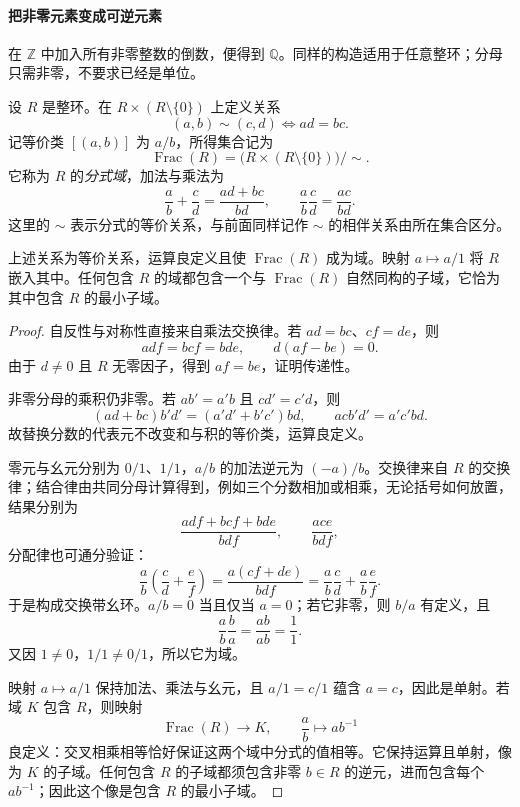 \documentclass[lang=cn,a4paper,fontset=none,zihao=false,10pt,openany,twoside]{beautybook}
\numberwithin{algorithm}{chapter}
\begin{document}
\paragraph{把非零元素变成可逆元素}
在 $\mathbb Z$ 中加入所有非零整数的倒数，便得到 $\mathbb Q$。同样的构造适用于任意整环；分母只需非零，不要求已经是单位。
\begin{definition}[分式域]
设 $R$ 是整环。在 $R\times(R\setminus\{0\})$ 上定义关系
\[
 (a,b)\sim(c,d)\Longleftrightarrow ad=bc.
\]
记等价类 $[(a,b)]$ 为 $a/b$，所得集合记为
\[
 \operatorname{Frac}(R)=\bigl(R\times(R\setminus\{0\})\bigr)/{\sim}.
\]
它称为 $R$ 的\emph{分式域}，加法与乘法为
\[
 \frac ab+\frac cd=\frac{ad+bc}{bd},\qquad
 \frac ab\frac cd=\frac{ac}{bd}.
\]
这里的 $\sim$ 表示分式的等价关系，与前面同样记作 $\sim$ 的相伴关系由所在集合区分。
\end{definition}
\begin{proposition}[分式域的良定义性与最小性]\label{prop:fraction-field}
上述关系为等价关系，运算良定义且使 $\operatorname{Frac}(R)$ 成为域。映射 $a\mapsto a/1$ 将 $R$ 嵌入其中。任何包含 $R$ 的域都包含一个与 $\operatorname{Frac}(R)$ 自然同构的子域，它恰为其中包含 $R$ 的最小子域。
\end{proposition}
\begin{proof}
自反性与对称性直接来自乘法交换律。若 $ad=bc$、$cf=de$，则
\[
 adf=bcf=bde,\qquad d(af-be)=0.
\]
由于 $d\ne0$ 且 $R$ 无零因子，得到 $af=be$，证明传递性。

非零分母的乘积仍非零。若 $ab'=a'b$ 且 $cd'=c'd$，则
\[
 (ad+bc)b'd'=(a'd'+b'c')bd,\qquad
 acb'd'=a'c'bd.
\]
故替换分数的代表元不改变和与积的等价类，运算良定义。

零元与幺元分别为 $0/1$、$1/1$，$a/b$ 的加法逆元为 $(-a)/b$。交换律来自 $R$ 的交换律；结合律由共同分母计算得到，例如三个分数相加或相乘，无论括号如何放置，结果分别为
\[
 \frac{adf+bcf+bde}{bdf},\qquad \frac{ace}{bdf},
\]
分配律也可通分验证：
\[
 \frac ab\left(\frac cd+\frac ef\right)
 =\frac{a(cf+de)}{bdf}
 =\frac ab\frac cd+\frac ab\frac ef.
\]
于是构成交换带幺环。$a/b=0$ 当且仅当 $a=0$；若它非零，则 $b/a$ 有定义，且
\[
 \frac ab\frac ba=\frac{ab}{ab}=\frac11.
\]
又因 $1\ne0$，$1/1\ne0/1$，所以它为域。

映射 $a\mapsto a/1$ 保持加法、乘法与幺元，且 $a/1=c/1$ 蕴含 $a=c$，因此是单射。若域 $K$ 包含 $R$，则映射
\[
 \operatorname{Frac}(R)\longrightarrow K,\qquad
 \frac ab\longmapsto ab^{-1}
\]
良定义：交叉相乘相等恰好保证这两个域中分式的值相等。它保持运算且单射，像为 $K$ 的子域。任何包含 $R$ 的子域都须包含非零 $b\in R$ 的逆元，进而包含每个 $ab^{-1}$；因此这个像是包含 $R$ 的最小子域。
\end{proof}
\end{document}
